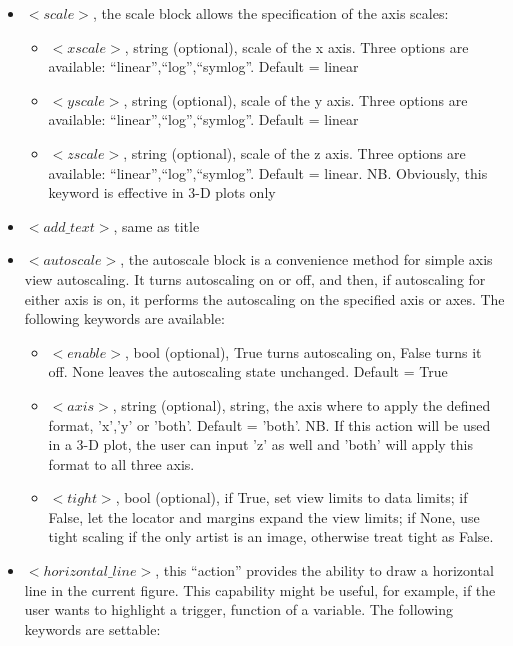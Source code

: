 \begin{itemize}
\begin{itemize}
      \end{itemize}
\item $<scale>$, the scale block allows the specification of the axis scales:
     \begin{itemize}
        \item \textit{$<xscale>$}, string  (optional), scale of the x axis. Three options are available: ``linear'',``log'',``symlog''. Default = linear
        \item \textit{$<yscale>$}, string  (optional), scale of the y axis. Three options are available: ``linear'',``log'',``symlog''. Default = linear
        \item \textit{$<zscale>$}, string  (optional), scale of the z axis. Three options are available: ``linear'',``log'',``symlog''. Default = linear. NB. Obviously, this keyword is effective in 3-D plots only
      \end{itemize}
\item $<add\_text>$, same as title
\item $<autoscale>$, the autoscale block is a convenience method for simple axis view autoscaling. It turns autoscaling on or off, and then, if autoscaling for either axis is on, it performs the autoscaling on the specified axis or axes. The following keywords are available:
     \begin{itemize}
        \item \textit{$<enable>$}, bool (optional), True turns autoscaling on, False turns it off. None leaves the autoscaling state unchanged. Default = True
        \item \textit{$<axis>$}, string  (optional),  string, the axis where to apply the defined format, 'x','y' or 'both'. Default = 'both'. NB. If this action will be used in a 3-D plot, the user can input 'z' as well and 'both' will apply this format to all three axis.
        \item \textit{$<tight>$}, bool  (optional), if True, set view limits to data limits; if False, let the locator and margins expand the view limits; if None, use tight scaling if the only artist is an image, otherwise treat tight as False.
      \end{itemize}
\item $<horizontal\_line>$, this ``action''  provides the ability to draw a horizontal line in the current figure. This capability might be useful, for example, if the user wants to highlight a trigger, function of a variable. The following keywords are settable:

\end{itemize}
